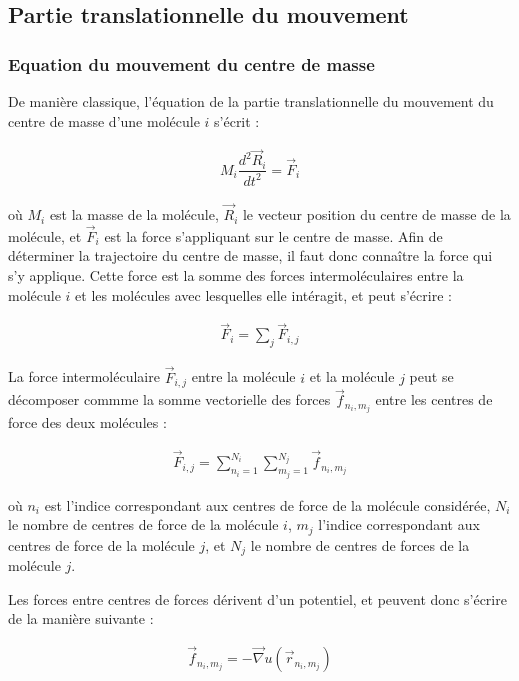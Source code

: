 \documentclass[12pt]{article}
\begin{document}
  \subsection{Partie translationnelle du mouvement}

  \subsubsection{Equation du mouvement du centre de masse}
De manière classique, l'équation de la partie translationnelle du mouvement du centre de masse d'une molécule $i$ s'écrit :

\begin{eqnarray} \label{eqn:trans}
M_{i} \dfrac{d^{2}\vec{R}_{i}}{dt^2}=\vec{F}_{i}
\end{eqnarray}

où $M_{i}$ est la masse de la molécule, $\vec{R}_{i}$ le vecteur position du centre de masse de la molécule, et $\vec{F}_{i}$ est la force s'appliquant sur le centre de masse. Afin de déterminer la trajectoire du centre de masse, il faut donc connaître la force qui s'y applique. Cette force est la somme des forces intermoléculaires entre la molécule $i$ et les molécules avec lesquelles elle intéragit, et peut s'écrire :

\begin{eqnarray}
\vec{F}_{i}=\sum_{j} \vec{F}_{i,j}
\end{eqnarray}

La force intermoléculaire $\vec{F}_{i,j}$ entre la molécule $i$ et la molécule $j$ peut se décomposer commme la somme vectorielle des forces $\vec{f}_{n_i,m_j}$ entre les centres de force des deux molécules :

\begin{eqnarray}
\vec{F}_{i,j}= \sum_{n_i=1}^{N_i} \sum_{m_j=1}^{N_j} \vec{f}_{n_i,m_j}
\end{eqnarray}

où $n_i$ est l'indice correspondant aux centres de force de la molécule considérée, $N_i$ le nombre de centres de force de la molécule $i$, $m_j$ l'indice correspondant aux centres de force de la molécule $j$, et $N_j$ le nombre de centres de forces de la molécule $j$.

Les forces entre centres de forces dérivent d'un potentiel, et peuvent donc s'écrire de la manière suivante :

\begin{eqnarray}
\vec{f}_{n_i,m_j}=-\vec{\nabla} u\left(\vec{r}_{n_i,m_j}\right)
\end{eqnarray}
\end{document}
